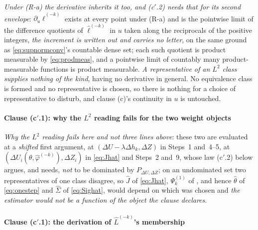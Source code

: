 \emph{Under (R-a) the derivative inherits it too, and \textup{(c$'$.2)} needs that for its second
envelope}: $\partial_u\hat\ell^{(-k)}$ exists at every point under (R-a) and is the pointwise limit
of the difference quotients of $\hat\ell^{(-k)}$ in $u$ taken along the reciprocals of the positive
integers, \emph{the increment is written out and carries no letter}, on the same ground as
\eqref{eq:supnormconv}'s countable dense set; each such quotient is product measurable by
\eqref{eq:prodmeas}, and a pointwise limit of countably many product-measurable functions is product
measurable. \emph{A representative of an $L^{2}$ class supplies nothing of the kind}, having no derivative
in general.
No equivalence class is formed and no representative is chosen, so there is nothing
for a choice of representative to disturb, and clause \textup{(c)}'s continuity in $u$ is untouched.

\paragraph{Clause \textup{(c$'$.1)}: why the $L^{2}$ reading fails for the two weight objects}

\emph{Why the $L^{2}$ reading fails here and not three lines above}: these two are evaluated at a
\emph{shifted} first argument, at $(\Delta U-\lambda\Delta h_k,\Delta Z)$ in  Steps~1
and~4--5, at $(\Delta U_i(\theta,\hat\varphi^{(-k)}),\Delta Z_i)$ in \eqref{eq:Jhat} and
 Steps~2 and~9, whose law \textup{(c$'$.2)} below argues, and needs, \emph{not} to be
dominated by $P_{\Delta U,\Delta Z}$; on an undominated set two representatives of one class disagree, so
$\hat J$ of \eqref{eq:Jhat}, $\Psi^{(1)}_k$ of , and hence $\hat\theta$ of
\eqref{eq:onestep} and $\hat\Sigma$ of \eqref{eq:Sighat}, would depend on which was chosen and
\emph{the estimator would not be a function of the object the clause declares}.

\paragraph{Clause \textup{(c$'$.1)}: the derivation of $\hat L^{(-k)}$'s membership}

